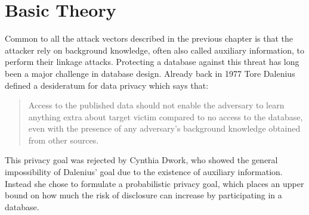 
\chapter{Basic Theory}

Common to all the attack vectors described in the previous chapter is that the attacker rely on background knowledge, often also called auxiliary information, to perform their linkage attacks. Protecting a database against this threat has long been a major challenge in database design. Already back in 1977 Tore Dalenius \cite{dalenius1977towards} defined a desideratum for data privacy which says that: \begin{quote}
	Access to the published data should not enable the adversary to learn anything extra about target victim compared to no access to the database, even with the presence of any adversary’s background knowledge obtained from other sources.
\end{quote} 

This privacy goal was rejected by Cynthia Dwork, who showed the general impossibility of Dalenius' goal due to the existence of auxiliary information. Instead she chose to formulate a probabilistic privacy goal, which places an upper bound on how much the risk of disclosure can increase by participating in a database.

%

